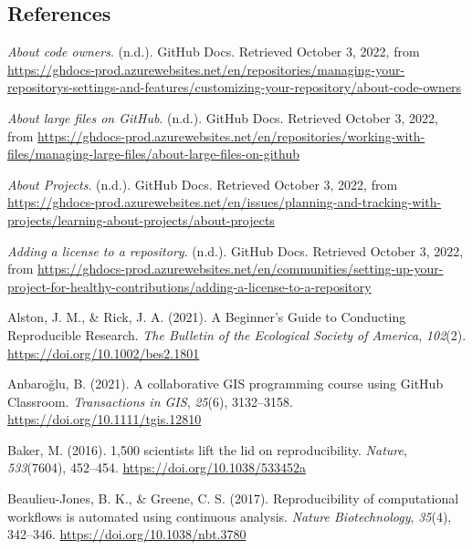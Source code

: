 \hypertarget{references}{%
\subsection{References}\label{references}}

\hypertarget{refs}{}
\begin{CSLReferences}{1}{0}
\leavevmode{}%
\emph{About code owners}. (n.d.). GitHub Docs. Retrieved October 3, 2022, from \url{https://ghdocs-prod.azurewebsites.net/en/repositories/managing-your-repositorys-settings-and-features/customizing-your-repository/about-code-owners}

\leavevmode{}%
\emph{About large files on GitHub}. (n.d.). GitHub Docs. Retrieved October 3, 2022, from \url{https://ghdocs-prod.azurewebsites.net/en/repositories/working-with-files/managing-large-files/about-large-files-on-github}

\leavevmode{}%
\emph{About Projects}. (n.d.). GitHub Docs. Retrieved October 3, 2022, from \url{https://ghdocs-prod.azurewebsites.net/en/issues/planning-and-tracking-with-projects/learning-about-projects/about-projects}

\leavevmode{}%
\emph{Adding a license to a repository}. (n.d.). GitHub Docs. Retrieved October 3, 2022, from \url{https://ghdocs-prod.azurewebsites.net/en/communities/setting-up-your-project-for-healthy-contributions/adding-a-license-to-a-repository}

\leavevmode{}%
Alston, J. M., \& Rick, J. A. (2021). A Beginner's Guide to Conducting Reproducible Research. \emph{The Bulletin of the Ecological Society of America}, \emph{102}(2). \url{https://doi.org/10.1002/bes2.1801}

\leavevmode{}%
Anbaroğlu, B. (2021). A collaborative GIS programming course using GitHub Classroom. \emph{Transactions in GIS}, \emph{25}(6), 3132--3158. \url{https://doi.org/10.1111/tgis.12810}

\leavevmode{}%
Baker, M. (2016). 1,500 scientists lift the lid on reproducibility. \emph{Nature}, \emph{533}(7604), 452--454. \url{https://doi.org/10.1038/533452a}

\leavevmode{}%
Beaulieu-Jones, B. K., \& Greene, C. S. (2017). Reproducibility of computational workflows is automated using continuous analysis. \emph{Nature Biotechnology}, \emph{35}(4), 342--346. \url{https://doi.org/10.1038/nbt.3780}


\end{CSLReferences}
